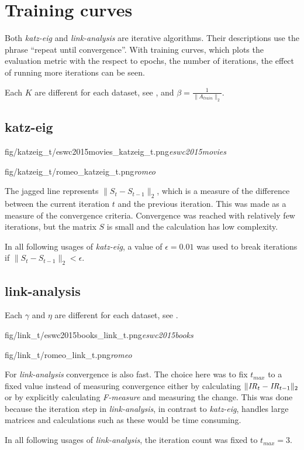 
\section{Training curves}\label{sec:graphs:training_curves}

Both \textit{katz-eig} and \textit{link-analysis} are iterative algorithms. Their descriptions use the phrase ``repeat until convergence''.  With training curves, which plots the evaluation metric with the respect to epochs, the number of iterations, the effect of running more iterations can be seen.

Each $K$ are different for each dataset, see , and $\beta = \frac{1}{\|A_{train}\|_2}$.

\subsection{katz-eig}\label{sec:training:katz}

\FloatBarrier

{fig/katzeig_t/eswc2015movies_katzeig_t.png}{\textit{eswc2015movies}}

{fig/katzeig_t/romeo_katzeig_t.png}{\textit{romeo}}

\FloatBarrier

The jagged line represents $\|S_t - S_{t - 1}\|_2$, which is a measure of the difference between the current iteration $t$ and the previous iteration. This was made as a measure of the convergence criteria. Convergence was reached with relatively few iterations, but the matrix $S$ is small and the calculation has low complexity.

In all following usages of \textit{katz-eig}, a value of $\epsilon = 0.01$ was used to break iterations if $\|S_t - S_{t - 1}\|_2 < \epsilon$.

\newpage


\subsection{link-analysis}\label{sec:training:link}

Each $\gamma$ and $\eta$ are different for each dataset, see .

{fig/link_t/eswc2015books_link_t.png}{\textit{eswc2015books}}

{fig/link_t/romeo_link_t.png}{\textit{romeo}}

For \textit{link-analysis} convergence is also fast. The choice here was to fix $t_{max}$ to a fixed value instead of measuring convergence either by calculating $\| \mathit{IR}_t - \mathit{IR}_{t - 1} \|_2$
or by explicitly calculating \textit{F-measure} and measuring the change. This was done because the iteration step in \textit{link-analysis}, in contrast to \textit{katz-eig}, handles large matrices and calculations such as these would be time consuming.

In all following usages of \textit{link-analysis}, the iteration count was fixed to $t_{max} = 3$.

